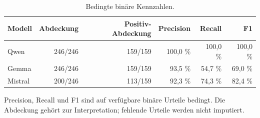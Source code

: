 \begin{table}[htbp]
\centering\small
\caption{Bedingte binäre Kennzahlen.}
\label{tab_v2_binary_conditional}
\begin{tabular}{lrrrrr}
\toprule
Modell & Abdeckung & Positiv-Abdeckung & Precision & Recall & F1 \\
\midrule
Qwen & 246/246 & 159/159 & 100,0 \% & 100,0 \% & 100,0 \% \\
Gemma & 246/246 & 159/159 & 93,5 \% & 54,7 \% & 69,0 \% \\
Mistral & 200/246 & 113/159 & 92,3 \% & 74,3 \% & 82,4 \% \\
\bottomrule
\end{tabular}
\par\smallskip\noindent
\begin{minipage}{\linewidth}\footnotesize Precision, Recall und F1 sind auf verfügbare binäre Urteile bedingt. Die Abdeckung gehört zur Interpretation; fehlende Urteile werden nicht imputiert.\end{minipage}
\end{table}
